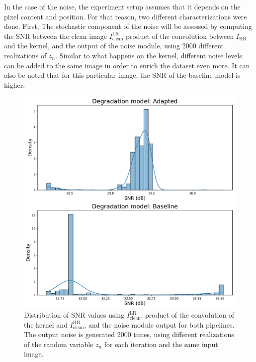         In the case of the noise, the experiment setup assumes that it depends on the pixel content and position.
        For that reason, two different characterizations were done. 
        First, The stochastic component of the noise will be assessed by computing the SNR between the clean image $I^{\text{LR}}_{\text{clean}}$ product of the convolution between $I_{\text{HR}}$ and the kernel, and the output of the noise module, using 2000 different realizations of $z_n$.
        Similar to what happens on the kernel, different noise levels can be added to the same image in order to enrich the dataset even more. It can also be noted that for this particular image, the SNR of the baseline model is higher.

        
        \begin{figure}[H]
            \centering
            \includegraphics[width=\textwidth]{Includes/5-source-noise-1-sample.pdf}
            \caption{Distribution of SNR values using $I^{\text{LR}}_{\text{clean}}$, product of the convolution of the kernel and $I^{\text{HR}}_{\text{clean}}$, and the noise module output for both pipelines.
                     The output noise is generated 2000 times, using different realizations of the random variable $z_n$ for each iteration and the same input image.
                    }
            \label{fig:5-source-noise-1-sample}
        \end{figure}
        


